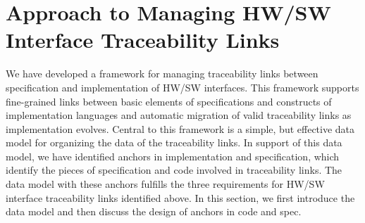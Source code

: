 \section{Approach to Managing HW/SW Interface Traceability Links}
\label{sec:approach}

%
%

We have developed a framework for managing traceability links between specification and implementation of HW/SW interfaces.
This framework supports fine-grained links between basic elements of specifications and constructs of implementation languages 
and automatic migration of valid traceability links as implementation evolves. Central to this framework is a simple, but 
effective data model for organizing the data of the traceability links. In support of this data model, we have identified 
anchors in implementation and specification, which identify the pieces of specification and code involved in traceability 
links. The data model with these anchors fulfills the three requirements for HW/SW interface traceability links identified above.
In this section, we first introduce the data model and then discuss the design of anchors in code and spec.  

